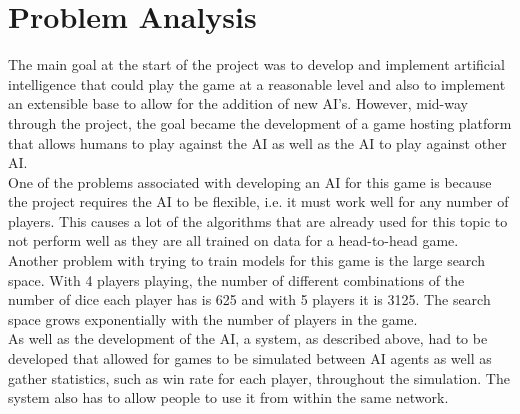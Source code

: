 \chapter{Problem Analysis}


The main goal at the start of the project was to develop and implement artificial intelligence that could play the game at a reasonable level and also to implement an extensible base to allow for the addition of new AI's. However, mid-way through the project, the goal became the development of a game hosting platform that allows humans to play against the AI as well as the AI to play against other AI.\\


One of the problems associated with developing an AI for this game is because the project requires the AI to be flexible, i.e. it must work well for any number of players. This causes a lot of the algorithms that are already used for this topic to not perform well as they are all trained on data for a head-to-head game. Another problem with trying to train models for this game is the large search space. With 4 players playing, the number of different combinations of the number of dice each player has is 625 and with 5 players it is 3125. The search space grows exponentially with the number of players in the game.\\


As well as the development of the AI, a system, as described above, had to be developed that allowed for games to be simulated between AI agents as well as gather statistics, such as win rate for each player, throughout the simulation. The system also has to allow people to use it from within the same network.


